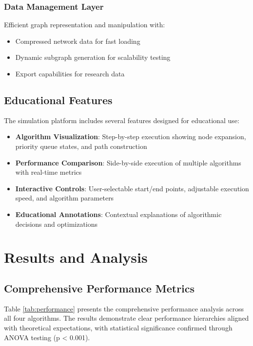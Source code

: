 \documentclass[conference]{IEEEtran}
\begin{document}
\subsubsection{Data Management Layer}
Efficient graph representation and manipulation with:
\begin{itemize}
\item Compressed network data for fast loading
\item Dynamic subgraph generation for scalability testing
\item Export capabilities for research data
\end{itemize}

\subsection{Educational Features}

The simulation platform includes several features designed for educational use:

\begin{itemize}
\item \textbf{Algorithm Visualization}: Step-by-step execution showing node expansion, priority queue states, and path construction
\item \textbf{Performance Comparison}: Side-by-side execution of multiple algorithms with real-time metrics
\item \textbf{Interactive Controls}: User-selectable start/end points, adjustable execution speed, and algorithm parameters
\item \textbf{Educational Annotations}: Contextual explanations of algorithmic decisions and optimizations
\end{itemize}

\section{Results and Analysis}

\subsection{Comprehensive Performance Metrics}

Table \ref{tab:performance} presents the comprehensive performance analysis across all four algorithms. The results demonstrate clear performance hierarchies aligned with theoretical expectations, with statistical significance confirmed through ANOVA testing (p < 0.001).
\end{document}
